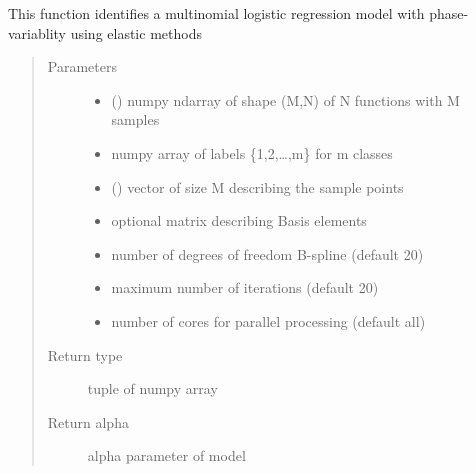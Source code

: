 \documentclass[letterpaper,10pt,english]{sphinxmanual}
\begin{document}
\begin{fulllineitems}
\label{\detokenize{regression:regression.elastic_mlogistic}}
This function identifies a multinomial logistic regression model with
phase-variablity using elastic methods
\begin{quote}\begin{description}
\item[{Parameters}] \leavevmode\begin{itemize}
\item {} 
 () \textendash{} numpy ndarray of shape (M,N) of N functions with M samples

\item {} 
 \textendash{} numpy array of labels \{1,2,…,m\} for m classes

\item {} 
 () \textendash{} vector of size M describing the sample points

\item {} 
 \textendash{} optional matrix describing Basis elements

\item {} 
 \textendash{} number of degrees of freedom B-spline (default 20)

\item {} 
 \textendash{} maximum number of iterations (default 20)

\item {} 
 \textendash{} number of cores for parallel processing (default all)

\end{itemize}

\item[{Return type}] \leavevmode
tuple of numpy array

\item[{Return alpha}] \leavevmode
alpha parameter of model


\end{description}
\end{quote}
\end{fulllineitems}
\end{document}
